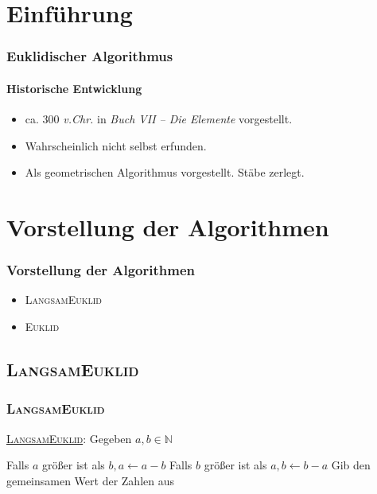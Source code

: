 \documentclass[•]{beamer}
\begin{document}
\section{Einf\"uhrung}

\begin{frame}       
	\frametitle{Euklidischer Algorithmus}
    \framesubtitle{Historische Entwicklung}
    \begin{itemize}
    \pause 
    \item  ca. 300 \textit{v.Chr.} in \textit{Buch VII -- Die Elemente} vorgestellt.
    \pause 
    \item Wahrscheinlich nicht selbst erfunden.
    \pause 
    \item Als geometrischen Algorithmus vorgestellt. St\"abe zerlegt.
    \end{itemize}
\end{frame}

\section{Vorstellung der Algorithmen}
\begin{frame}
	\frametitle{Vorstellung der Algorithmen}
	\begin{itemize}
	\item \textsc{LangsamEuklid}
	\item \textsc{Euklid}
	\end{itemize}
\end{frame}


\subsection{\textsc{LangsamEuklid}}
\begin{frame}
	\frametitle{\textsc{LangsamEuklid}}
	\underline{\textsc{LangsamEuklid}}: Gegeben $a,b\in\mathbb{N}$
	\pause
	\begin{algorithmic}[1]
	\pause
	\State Falls $a$ gr\"o{\ss}er ist als $b, a\gets a-b$
	\State Falls $b$ gr\"o{\ss}er ist als $a, b\gets b-a$
	\pause
\EndWhile
	\pause
	\State Gib den gemeinsamen Wert der Zahlen aus
\end{algorithmic}
\end{frame}
\end{document}

